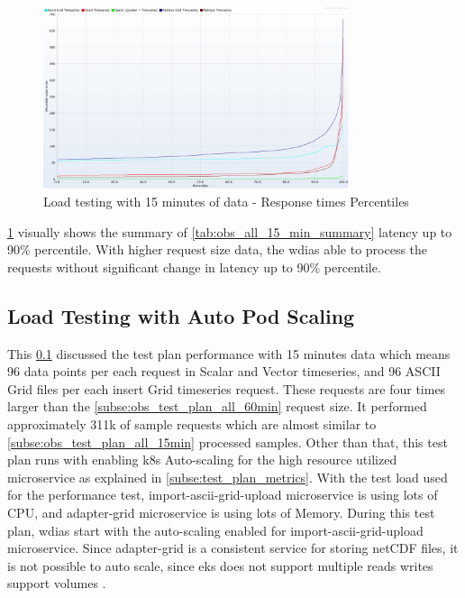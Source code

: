 \begin{figure}[htp]
    \centering
    \includegraphics[width=0.8\textwidth]{results/obs/all/obs_all_15m_response_times_percentiles.png}
    \caption{Load testing with 15 minutes of data - Response times Percentiles}
    \label{fi:test_obs_all_15m_latency_percentile}
\end{figure}
\cref{fi:test_obs_all_15m_latency_percentile} visually shows the summary of \cref{tab:obs_all_15_min_summary} latency up to 90\% percentile. With higher request size data, the \acrshort{wdias} able to process the requests without significant change in latency up to 90\% percentile.


\subsection{Load Testing with Auto Pod Scaling}
\label{subse:obs_test_plan_all_auto_15min}

This \cref{subse:obs_test_plan_all_auto_15min} discussed the test plan performance with 15 minutes data which means 96 data points per each request in Scalar and Vector timeseries, and 96 ASCII Grid files per each insert Grid timeseries request. These requests are four times larger than the \cref{subse:obs_test_plan_all_60min} request size. It performed approximately 311k of sample requests which are almost similar to \cref{subse:obs_test_plan_all_15min} processed samples.
Other than that, this test plan runs with enabling \acrshort{k8s} Auto-scaling for the high resource utilized microservice as explained in \cref{subse:test_plan_metrics}. With the test load used for the performance test, import-ascii-grid-upload microservice is using lots of CPU, and adapter-grid microservice is using lots of Memory. During this test plan, \acrshort{wdias} start with the auto-scaling enabled for import-ascii-grid-upload microservice. Since adapter-grid is a consistent service for storing netCDF files, it is not possible to auto scale, since \acrshort{eks} does not support multiple reads writes support volumes \cite{LinuxFoundationPersistentKubernetes}.


